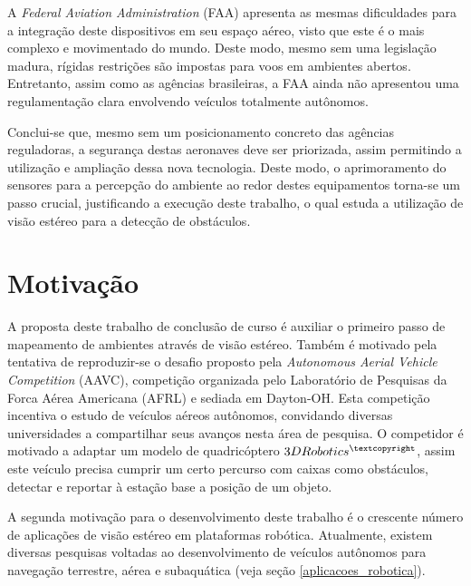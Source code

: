 A \textit{Federal Aviation Administration} (FAA) apresenta as mesmas dificuldades para a integração deste dispositivos em seu espaço aéreo, visto que este é o mais complexo e movimentado do mundo. Deste modo, mesmo sem uma legislação madura, rígidas restrições são impostas para voos em ambientes abertos. Entretanto, assim como as agências brasileiras, a FAA ainda não apresentou uma regulamentação clara envolvendo veículos totalmente autônomos. 

Conclui-se que, mesmo sem um posicionamento concreto das agências reguladoras, a segurança destas aeronaves deve ser priorizada, assim permitindo a utilização e ampliação dessa nova tecnologia. Deste modo, o aprimoramento do sensores para a percepção do ambiente ao redor destes equipamentos torna-se um passo crucial, justificando a execução deste trabalho, o qual estuda a utilização de visão estéreo para a detecção de obstáculos.


\section{Motivação}

A proposta deste trabalho de conclusão de curso é auxiliar o primeiro passo de mapeamento de ambientes através de visão estéreo. Também é motivado pela tentativa de reproduzir-se o desafio proposto pela \textit{Autonomous Aerial Vehicle Competition} (AAVC)\cite{AAVC}, competição organizada pelo Laboratório de Pesquisas da Forca Aérea Americana (AFRL) e sediada em Dayton-OH. Esta competição incentiva o estudo de veículos aéreos autônomos, convidando diversas universidades a compartilhar seus avanços nesta área de pesquisa. O competidor é motivado a adaptar um modelo de quadricóptero $3DRobotics^{\textcopyright}$, assim este veículo precisa cumprir um certo percurso com caixas como obstáculos, detectar e reportar à estação base a posição de um objeto.

A segunda motivação para o desenvolvimento deste trabalho é o crescente número de aplicações de visão estéreo em plataformas robótica. Atualmente, existem diversas pesquisas voltadas ao desenvolvimento de veículos autônomos para navegação terrestre, aérea e subaquática (veja seção \ref{aplicacoes_robotica}).


